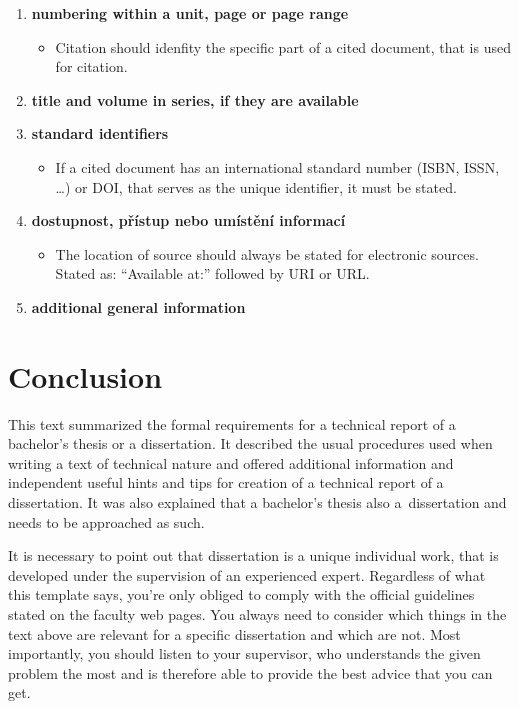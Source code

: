 \begin{enumerate}
\begin{itemize}
    \end{itemize}
    \item \textbf{numbering within a unit, page or page range}
    \begin{itemize}
        \item Citation should idenfity the specific part of a cited document, that is used for citation.
    \end{itemize}
    \item \textbf{title and volume in series, if they are available}
    \item \textbf{standard identifiers}
    \begin{itemize}
        \item If a cited document has an international standard number (ISBN, ISSN, \ldots) or DOI, that serves as the unique identifier, it must be stated.
    \end{itemize}
    \item \textbf{dostupnost, přístup nebo umístění informací}
    \begin{itemize}
        \item The location of source should always be stated for electronic sources. Stated as: ``Available at:'' followed by URI or URL.
    \end{itemize}
    \item \textbf{additional general information}
\end{enumerate}

\chapter{Conclusion}
\label{zaver}

This text summarized the formal requirements for a technical report of a bachelor's thesis or a dissertation. It described the usual procedures used when writing a text of technical nature and offered additional information and independent useful hints and tips for creation of a technical report of a dissertation. It was also explained that a bachelor's thesis also a~dissertation and needs to be approached as such.

It is necessary to point out that dissertation is a unique individual work, that is developed under the supervision of an experienced expert. Regardless of what this template says, you're only obliged to comply with the official guidelines stated on the faculty web pages. You always need to consider which things in the text above are relevant for a specific dissertation and which are not. Most importantly, you should listen to your supervisor, who understands the given problem the most and is therefore able to provide the best advice that you can get.


